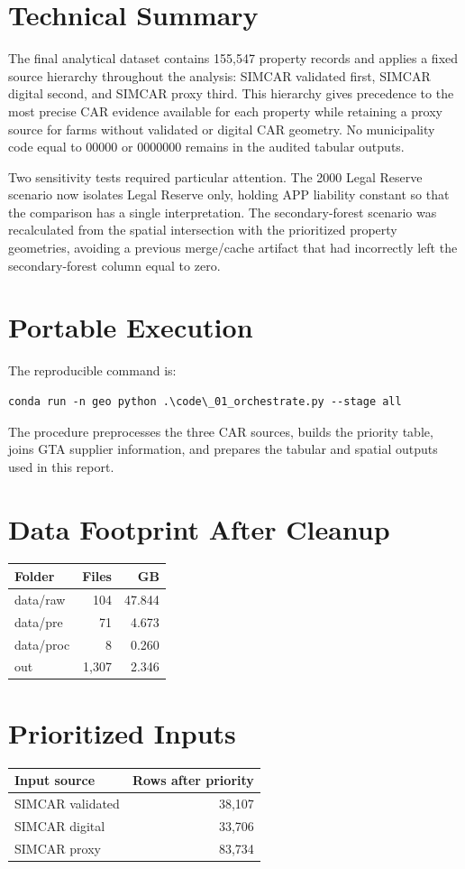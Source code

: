 \documentclass[12pt]{article}
\begin{document}
\section*{Technical Summary}
The final analytical dataset contains 155,547 property records and applies a fixed source hierarchy throughout the analysis: SIMCAR validated first, SIMCAR digital second, and SIMCAR proxy third. This hierarchy gives precedence to the most precise CAR evidence available for each property while retaining a proxy source for farms without validated or digital CAR geometry. No municipality code equal to 00000 or 0000000 remains in the audited tabular outputs.

Two sensitivity tests required particular attention. The 2000 Legal Reserve scenario now isolates Legal Reserve only, holding APP liability constant so that the comparison has a single interpretation. The secondary-forest scenario was recalculated from the spatial intersection with the prioritized property geometries, avoiding a previous merge/cache artifact that had incorrectly left the secondary-forest column equal to zero.

\section*{Portable Execution}
The reproducible command is:
\begin{verbatim}
conda run -n geo python .\code\_01_orchestrate.py --stage all
\end{verbatim}
The procedure preprocesses the three CAR sources, builds the priority table, joins GTA supplier information, and prepares the tabular and spatial outputs used in this report.

\section*{Data Footprint After Cleanup}
\begin{tabular}{lrr}
\toprule
Folder & Files & GB \\
\midrule
data/raw & 104 & 47.844 \\
data/pre & 71 & 4.673 \\
data/proc & 8 & 0.260 \\
out & 1,307 & 2.346 \\
\bottomrule
\end{tabular}

\section*{Prioritized Inputs}
\begin{tabular}{lr}
\toprule
Input source & Rows after priority \\
\midrule
SIMCAR validated & 38,107 \\
SIMCAR digital & 33,706 \\
SIMCAR proxy & 83,734 \\
\bottomrule
\end{tabular}
\end{document}
